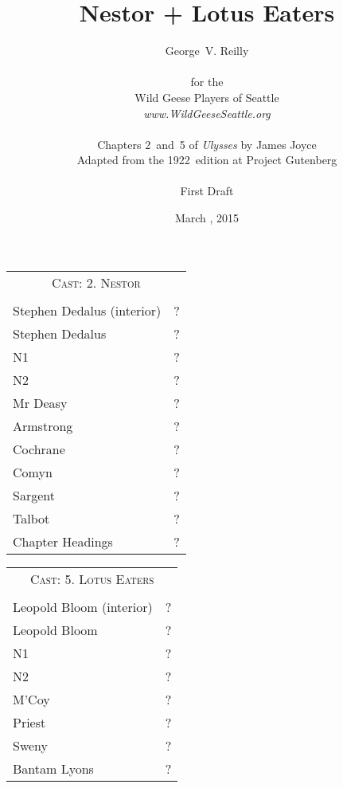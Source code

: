 



\title{\Huge Nestor + Lotus Eaters}
\author{George~V. Reilly\\
\\
{\small for the}\\
Wild Geese Players of Seattle\\
{\emph{www.WildGeeseSeattle.org}}\\
\\
{\small Chapters 2~and~5 of \emph{Ulysses} by James Joyce}\\
{\small Adapted from the 1922~edition at Project Gutenberg}
\\
\\
{\small First Draft}}
\date{March , 2015}
\raggedbottom



\maketitle
\thispagestyle{empty}
\pagebreak

\begin{tabular}{lp{10cm}}
    \multicolumn{2}{c}{\Large \textsc{Cast: 2. Nestor}} \\
\\
Stephen Dedalus (interior) & ? \\
Stephen Dedalus  &  ?\\
N1 & ? \\
N2 & ? \\
Mr Deasy & ? \\
Armstrong & ? \\
Cochrane & ? \\
Comyn & ? \\
Sargent & ? \\
Talbot & ? \\
Chapter Headings & ? \\
\end{tabular}

\bigskip
\bigskip
\bigskip

\begin{tabular}{lp{10cm}}
    \multicolumn{2}{c}{\Large \textsc{Cast: 5. Lotus Eaters}} \\
\\
Leopold Bloom (interior) & ? \\
Leopold Bloom & ? \\
N1 & ? \\
N2 & ? \\
M'Coy & ? \\
Priest & ? \\
Sweny & ? \\
Bantam Lyons & ? \\
\end{tabular}
\thispagestyle{empty}

